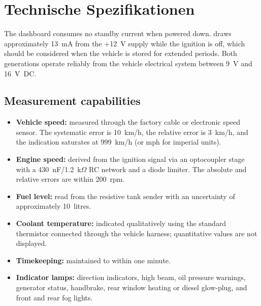 \chapter{Technische Spezifikationen}\label{ch:technical-specs}

The \ReplicaGenOne{} dashboard consumes no standby current when powered down. \ReplicaNextShort{} draws approximately 13~mA from the +12~V supply while the ignition is off, which should be considered when the vehicle is stored for extended periods. Both generations operate reliably from the vehicle electrical system between 9~V and 16~V~DC.

\section{Measurement capabilities}
\begin{itemize}
    \item \textbf{Vehicle speed:} measured through the factory cable or electronic speed sensor. The systematic error is 10~km/h, the relative error is 3~km/h, and the indication saturates at 999~km/h (or mph for imperial units).
    \item \textbf{Engine speed:} derived from the ignition signal via an optocoupler stage with a 430~nF/1.2~k\ensuremath{\Omega} RC network and a diode limiter. The absolute and relative errors are within 200~rpm.
    \item \textbf{Fuel level:} read from the resistive tank sender with an uncertainty of approximately 10~litres.
    \item \textbf{Coolant temperature:} indicated qualitatively using the standard thermistor connected through the vehicle harness; quantitative values are not displayed.
    \item \textbf{Timekeeping:} maintained to within one minute.
    \item \textbf{Indicator lamps:} direction indicators, high beam, oil pressure warnings, generator status, handbrake, rear window heating or diesel glow-plug, and front and rear fog lights.
\end{itemize}
